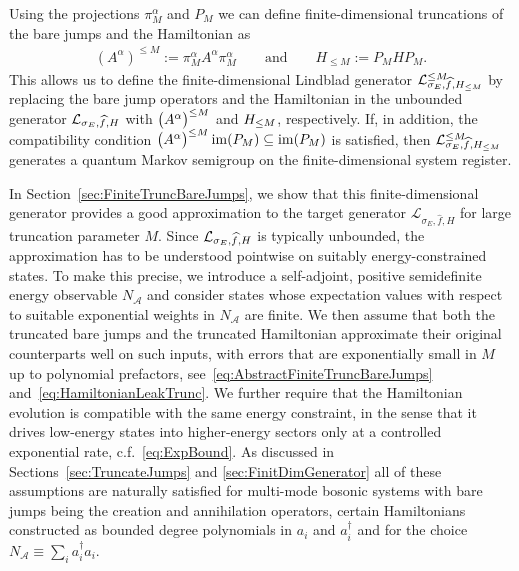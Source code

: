 \documentclass[11pt]{amsart}
\newcommand{\1}{\mathbbm{1}}
\newcommand{\NA}{N_{\mathcal{A}}}
\theoremstyle{plain}
\theoremstyle{definition}
\theoremstyle{remark}
\numberwithin{equation}{section}
\begin{document}
Using the projections $\pi^\alpha_M$ and $P_M$ we can define finite-dimensional truncations of the bare jumps and the Hamiltonian as 
\begin{align}
\left(A^\alpha\right)^{\le M} := \pi^\alpha_M A^\alpha\pi^\alpha_M\qquad\text{and}\qquad  H_{\le M} := P_M H P_M.
\end{align}
This allows us to define the finite-dimensional Lindblad generator
$\mathcal{L}^{\smash{\leq M}}_{\smash{\sigma_E,\widehat f,H_{\leq M}}}$
by replacing the bare jump operators and the Hamiltonian in the unbounded generator
$\mathcal{L}_{\smash{\sigma_E,\widehat f,H}}$
with $\bigl(A^\alpha\bigr)^{\smash{\leq M}}$ and $H_{\smash{\leq M}}$, respectively. If, in addition, the compatibility condition
$
\bigl(A^\alpha\bigr)^{\smash{\leq M}}\operatorname{im}(P_M)\subseteq \operatorname{im}(P_M)$
is satisfied, then
$\mathcal{L}^{\smash{\leq M}}_{\smash{\sigma_E,\widehat f,H_{\leq M}}}$
generates a quantum Markov semigroup on the finite-dimensional system register.

In Section~\ref{sec:FiniteTruncBareJumps}, we show that this finite-dimensional generator provides a good approximation to the target generator $\mathcal{L}_{\sigma_E,\widehat f,H}$ for large truncation parameter $M$. Since $\mathcal{L}_{\smash{\sigma_E,\widehat f,H}}$ is typically unbounded, the approximation has to be understood pointwise on suitably energy-constrained states. To make this precise, we introduce a self-adjoint, positive semidefinite energy observable $\NA$ and consider states whose expectation values with respect to suitable exponential weights in $\NA$ are finite. We then assume that both the truncated bare jumps and the truncated Hamiltonian approximate their original counterparts well on such inputs, with errors that are exponentially small in $M$ up to polynomial prefactors, see~\eqref{eq:AbstractFiniteTruncBareJumps} and~\eqref{eq:HamiltonianLeakTrunc}. We further require that the Hamiltonian evolution is compatible with the same energy constraint, in the sense that it drives low-energy states into higher-energy sectors only at a controlled exponential rate, c.f.~\eqref{eq:ExpBound}. As discussed in Sections~\ref{sec:TruncateJumps} and \ref{sec:FinitDimGenerator} all of these assumptions are naturally satisfied for multi-mode bosonic systems with bare jumps being the creation and annihilation operators, certain Hamiltonians constructed as bounded degree polynomials in $a_i$ and $a^\dagger_i$ and for the choice $\NA \equiv \sum_{i} a^\dagger_ia_i.$   
\end{document}

